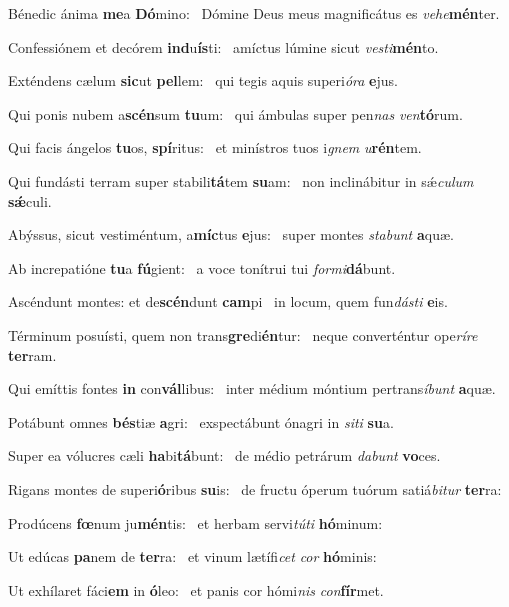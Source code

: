 \item Bénedic ánima \textbf{me}a \textbf{Dó}mino:~\psstar{} Dómine Deus meus magnificátus es \textit{vehe}\textbf{mén}ter.
\item Confessiónem et decórem \textbf{ind}u\textbf{ís}ti:~\psstar{} amíctus lúmine sicut \textit{vesti}\textbf{mén}to.
\item Exténdens cælum \textbf{sic}ut \textbf{pel}lem:~\psstar{} qui tegis aquis superi\textit{óra} \textbf{e}jus.
\item Qui ponis nubem a\textbf{scén}sum \textbf{tu}um:~\psstar{} qui ámbulas super pen\textit{nas} \textit{ven}\textbf{tó}rum.
\item Qui facis ángelos \textbf{tu}os, \textbf{spí}ritus:~\psstar{} et minístros tuos i\textit{gnem} \textit{u}\textbf{rén}tem.
\item Qui fundásti terram super stabili\textbf{tá}tem \textbf{su}am:~\psstar{} non inclinábitur in sǽ\textit{culum} \textbf{sǽ}culi.
\item Abýssus, sicut vestiméntum, a\textbf{míc}tus \textbf{e}jus:~\psstar{} super montes \textit{stabunt} \textbf{a}quæ.
\item Ab increpatióne \textbf{tu}a \textbf{fú}gient:~\psstar{} a voce tonítrui tui \textit{formi}\textbf{dá}bunt.
\item Ascéndunt montes: et de\textbf{scén}dunt \textbf{cam}pi~\psstar{} in locum, quem fun\textit{dásti} \textbf{e}is.
\item Términum posuísti, quem non trans\textbf{gre}di\textbf{én}tur:~\psstar{} neque converténtur ope\textit{ríre} \textbf{ter}ram.
\item Qui emíttis fontes \textbf{in} con\textbf{vál}libus:~\psstar{} inter médium móntium pertrans\textit{íbunt} \textbf{a}quæ.
\item Potábunt omnes \textbf{bés}tiæ \textbf{a}gri:~\psstar{} exspectábunt ónagri in \textit{siti} \textbf{su}a.
\item Super ea vólucres cæli \textbf{ha}bi\textbf{tá}bunt:~\psstar{} de médio petrárum \textit{dabunt} \textbf{vo}ces.
\item Rigans montes de superi\textbf{ó}ribus \textbf{su}is:~\psstar{} de fructu óperum tuórum satiá\textit{bitur} \textbf{ter}ra:
\item Prodúcens \textbf{fœ}num ju\textbf{mén}tis:~\psstar{} et herbam servi\textit{túti} \textbf{hó}minum:
\item Ut edúcas \textbf{pa}nem de \textbf{ter}ra:~\psstar{} et vinum lætífi\textit{cet} \textit{cor} \textbf{hó}minis:
\item Ut exhílaret fáci\textbf{em} in \textbf{ó}leo:~\psstar{} et panis cor hómi\textit{nis} \textit{con}\textbf{fír}met.
